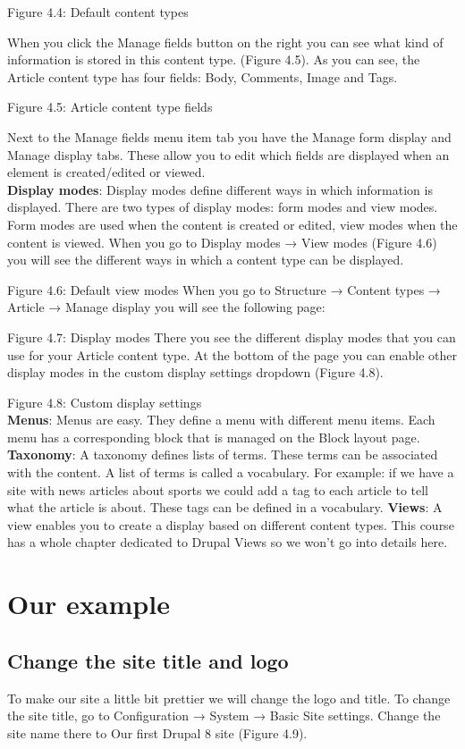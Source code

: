 Figure 4.4: Default content types

When you click the Manage fields button on the right you can see what kind of information is stored in this content type. (Figure 4.5). As you can see, the Article content type has four fields: Body, Comments, Image and Tags.

Figure 4.5: Article content type fields

Next to the Manage fields menu item tab you have the Manage form display and Manage display tabs. These allow you to edit which fields are displayed when an element is created/edited or viewed.
\\
\textbf{Display modes}: Display modes define different ways in which information is displayed. There are two types of display modes: form modes and view modes. Form modes are used when the content is created or edited, view modes when the content is viewed. When you go to Display modes → View modes (Figure 4.6) you will see the different ways in which a content type can be displayed.

Figure 4.6: Default view modes
When you go to Structure → Content types → Article → Manage display you will see the following page:

Figure 4.7: Display modes
There you see the different display modes that you can use for your Article content type. At the bottom of the page you can enable other display modes in the custom display settings dropdown (Figure 4.8).

Figure 4.8: Custom display settings
\\
\textbf{Menus}: Menus are easy. They define a menu with different menu items. Each menu has a corresponding block that is managed on the Block layout page.
\textbf{Taxonomy}: A taxonomy defines lists of terms. These terms can be associated with the content. A list of terms is called a vocabulary. For example: if we have a site with news articles about sports we could add a tag to each article to tell what the article is about. These tags can be defined in a vocabulary.
\textbf{Views}: A view enables you to create a display based on different content types. This course has a whole chapter dedicated to Drupal Views so we won’t go into details here.
\section{Our example}
\subsection{Change the site title and logo}
To make our site a little bit prettier we will change the logo and title. To change the site title, go to Configuration → System → Basic Site settings. Change the site name there to Our first Drupal 8 site (Figure 4.9).


